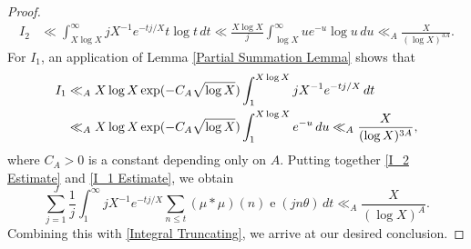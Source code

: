 \documentclass[10pt,a4paper]{amsart}
\newcommand{\e}{\operatorname{e}}
\begin{document}
\begin{proof}
\begin{align}
    I_2 & \ll   \int_{X\log X}^\infty jX^{-1}e^{-tj/X} t \log t \, dt  \ll \frac{X \log X}{j} \int_{\log X}^\infty ue^{-u} \log u  \, du \ll_A \frac{X}{(\log X)^{3A}}. \label{I_2 Estimate}
\end{align}
For $I_1$, an application of Lemma \ref{Partial Summation Lemma} shows that
\begin{align}\label{I_1 Estimate}
    I_1 & \ll_A X \log X \exp(-C_A \sqrt{\log X})  \int_1^{X\log X} jX^{-1}e^{-tj/X} \, dt \notag \\
   & \ll_A X \log X \exp(-C_A \sqrt{\log X}) \int_{1}^{X\log X} e^{-u}   \, du \ll_A \frac{X}{(\log X)^{3A}},
\end{align}
where $C_A>0$ is a constant depending only on $A$. Putting together \eqref{I_2 Estimate} and \eqref{I_1 Estimate}, we obtain
\[ \sum_{j=1}^J \frac{1}{j} \int_1^\infty jX^{-1}e^{-tj/X} \sum_{n \leqslant t}  (\mu * \mu)(n) \e(j n \theta) \, dt \ll_A \frac{X}{(\log X)^{A}}.
\]
Combining this with \eqref{Integral Truncating}, we arrive at our desired conclusion.
\end{proof}
\end{document}
